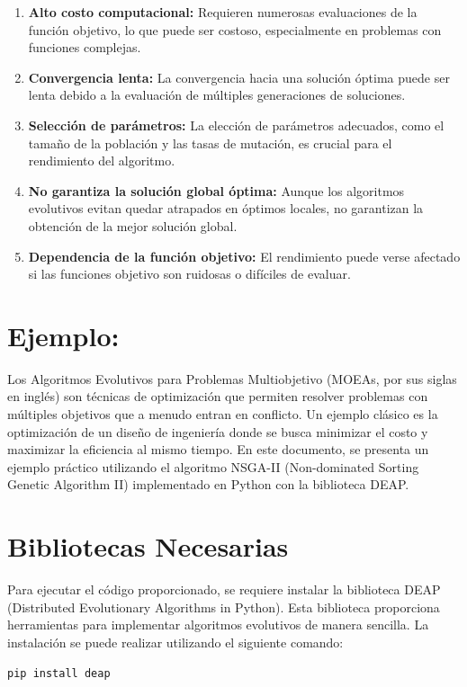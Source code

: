 \documentclass[12pt]{article}
\begin{document}
\begin{enumerate}
    \item \textbf{Alto costo computacional:} Requieren numerosas evaluaciones de la función objetivo, lo que puede ser costoso, especialmente en problemas con funciones complejas.
    \item \textbf{Convergencia lenta:} La convergencia hacia una solución óptima puede ser lenta debido a la evaluación de múltiples generaciones de soluciones.
    \item \textbf{Selección de parámetros:} La elección de parámetros adecuados, como el tamaño de la población y las tasas de mutación, es crucial para el rendimiento del algoritmo.
    \item \textbf{No garantiza la solución global óptima:} Aunque los algoritmos evolutivos evitan quedar atrapados en óptimos locales, no garantizan la obtención de la mejor solución global.
    \item \textbf{Dependencia de la función objetivo:} El rendimiento puede verse afectado si las funciones objetivo son ruidosas o difíciles de evaluar.
\end{enumerate}

\section*{Ejemplo:}
Los Algoritmos Evolutivos para Problemas Multiobjetivo (MOEAs, por sus siglas en inglés) son técnicas de optimización que permiten resolver problemas con múltiples objetivos que a menudo entran en conflicto. Un ejemplo clásico es la optimización de un diseño de ingeniería donde se busca minimizar el costo y maximizar la eficiencia al mismo tiempo. En este documento, se presenta un ejemplo práctico utilizando el algoritmo NSGA-II (Non-dominated Sorting Genetic Algorithm II) implementado en Python con la biblioteca DEAP.

\section*{Bibliotecas Necesarias}
Para ejecutar el código proporcionado, se requiere instalar la biblioteca DEAP (Distributed Evolutionary Algorithms in Python). Esta biblioteca proporciona herramientas para implementar algoritmos evolutivos de manera sencilla. La instalación se puede realizar utilizando el siguiente comando:

\begin{lstlisting}[language=bash]
pip install deap
\end{lstlisting}
\end{document}
